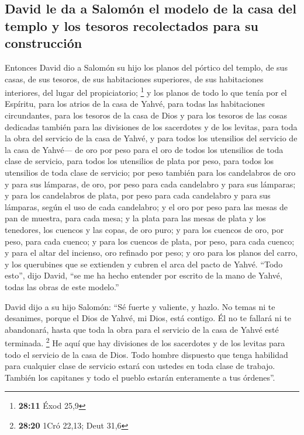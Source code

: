 \begin{paracol}{2}
\hypertarget{david-le-da-a-salomuxf3n-el-modelo-de-la-casa-del-templo-y-los-tesoros-recolectados-para-su-construcciuxf3n}{%
\subsection{David le da a Salomón el modelo de la casa del templo y los
tesoros recolectados para su
construcción}\label{david-le-da-a-salomuxf3n-el-modelo-de-la-casa-del-templo-y-los-tesoros-recolectados-para-su-construcciuxf3n}}

 Entonces David dio a Salomón su hijo los planos del
pórtico del templo, de sus casas, de sus tesoros, de sus habitaciones
superiores, de sus habitaciones interiores, del lugar del propiciatorio;
\footnote{\textbf{28:11} Éxod 25,9}  y los planos de todo
lo que tenía por el Espíritu, para los atrios de la casa de Yahvé, para
todas las habitaciones circundantes, para los tesoros de la casa de Dios
y para los tesoros de las cosas dedicadas  también para
las divisiones de los sacerdotes y de los levitas, para toda la obra del
servicio de la casa de Yahvé, y para todos los utensilios del servicio
de la casa de Yahvé---  de oro por peso para el oro de
todos los utensilios de toda clase de servicio, para todos los
utensilios de plata por peso, para todos los utensilios de toda clase de
servicio;  por peso también para los candelabros de oro y
para sus lámparas, de oro, por peso para cada candelabro y para sus
lámparas; y para los candelabros de plata, por peso para cada candelabro
y para sus lámparas, según el uso de cada candelabro;  y
el oro por peso para las mesas de pan de muestra, para cada mesa; y la
plata para las mesas de plata  y los tenedores, los
cuencos y las copas, de oro puro; y para los cuencos de oro, por peso,
para cada cuenco; y para los cuencos de plata, por peso, para cada
cuenco;  y para el altar del incienso, oro refinado por
peso; y oro para los planos del carro, y los querubines que se extienden
y cubren el arca del pacto de Yahvé.  ``Todo esto'', dijo
David, ``se me ha hecho entender por escrito de la mano de Yahvé, todas
las obras de este modelo.''

 David dijo a su hijo Salomón: ``Sé fuerte y valiente, y
hazlo. No temas ni te desanimes, porque el Dios de Yahvé, mi Dios, está
contigo. Él no te fallará ni te abandonará, hasta que toda la obra para
el servicio de la casa de Yahvé esté terminada. \footnote{\textbf{28:20}
  1Cró 22,13; Deut 31,6}  He aquí que hay divisiones de
los sacerdotes y de los levitas para todo el servicio de la casa de
Dios. Todo hombre dispuesto que tenga habilidad para cualquier clase de
servicio estará con ustedes en toda clase de trabajo. También los
capitanes y todo el pueblo estarán enteramente a tus órdenes''.


\end{paracol}
